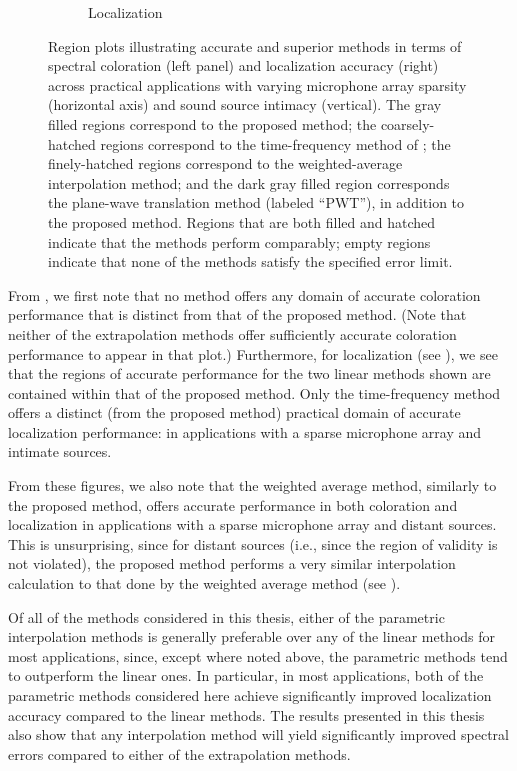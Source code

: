\begin{figure}[t]
\begin{subfigure}[b]{0.49\textwidth}
		\caption{Localization}
		\label{fig:11_Conclusions:Region_Plots:Localization}
	\end{subfigure}
	
	\caption[Region plots of practical applicability of each navigational method.]{
	Region plots illustrating accurate and superior methods in terms of spectral coloration (left panel) and localization accuracy (right) across practical applications with varying microphone array sparsity (horizontal axis) and sound source intimacy (vertical).
	The gray filled regions correspond to the proposed method;
	the coarsely-hatched regions correspond to the time-frequency method of \citet{Thiergart2013};
	the finely-hatched regions correspond to the weighted-average interpolation method;
	and the dark gray filled region corresponds the plane-wave translation method (labeled ``PWT''), in addition to the proposed method.
	Regions that are both filled and hatched indicate that the methods perform comparably;
	empty regions indicate that none of the methods satisfy the specified error limit.}
	\label{fig:11_Conclusions:Region_Plots}
\end{figure}

From , we first note that no method offers any domain of accurate coloration performance that is distinct from that of the proposed method.
(Note that neither of the extrapolation methods offer sufficiently accurate coloration performance to appear in that plot.)
Furthermore, for localization (see ), we see that the regions of accurate performance for the two linear methods shown are contained within that of the proposed method.
Only the time-frequency method offers a distinct (from the proposed method) practical domain of accurate localization performance: in applications with a sparse microphone array and intimate sources.

From these figures, we also note that the weighted average method, similarly to the proposed method, offers accurate performance in both coloration and localization in applications with a sparse microphone array and distant sources.
This is unsurprising, since for distant sources (i.e., since the region of validity is not violated), the proposed method performs a very similar interpolation calculation to that done by the weighted average method (see ).

Of all of the methods considered in this thesis, either of the parametric interpolation methods is generally preferable over any of the linear methods for most applications, since, except where noted above, the parametric methods tend to outperform the linear ones.
In particular, in most applications, both of the parametric methods considered here achieve significantly improved localization accuracy compared to the linear methods.
The results presented in this thesis also show that any interpolation method will yield significantly improved spectral errors compared to either of the extrapolation methods.

